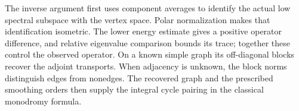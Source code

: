 The inverse argument first uses component
averages to identify the actual low spectral
subspace with the vertex space. Polar
normalization makes that identification
isometric. The lower energy estimate gives
a positive operator difference, and relative
eigenvalue comparison bounds its trace;
together these control the observed operator.
On a known simple graph its off-diagonal
blocks recover the adjoint transports.
When adjacency is unknown, the block norms
distinguish edges from nonedges. The recovered
graph and the prescribed smoothing orders
then supply the integral cycle pairing
in the classical monodromy formula.
